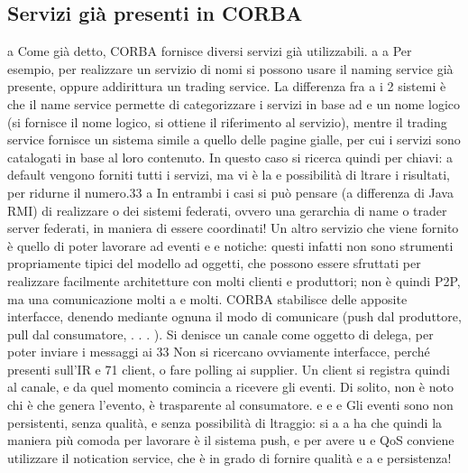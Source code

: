 \documentclass[a4paper,12pt]{article}
\begin{document}
\subsection{Servizi già presenti in CORBA}
a
Come già detto, CORBA fornisce diversi servizi già utilizzabili.
a
a
Per esempio, per realizzare un servizio di nomi si possono usare il naming
service già presente, oppure addirittura un trading service. La differenza fra
a
i 2 sistemi è che il name service permette di categorizzare i servizi in base ad
e
un nome logico (si fornisce il nome logico, si ottiene il riferimento al servizio),
mentre il trading service fornisce un sistema simile a quello delle pagine gialle,
per cui i servizi sono catalogati in base al loro contenuto. In questo caso si
ricerca quindi per chiavi: a default vengono forniti tutti i servizi, ma vi è la
e
possibilità di ltrare i risultati, per ridurne il numero.33
a
In entrambi i casi si può pensare (a differenza di Java RMI) di realizzare
o
dei sistemi federati, ovvero una gerarchia di name o trader server federati, in
maniera di essere coordinati!
Un altro servizio che viene fornito è quello di poter lavorare ad eventi e
e
notiche: questi infatti non sono strumenti propriamente tipici del modello ad
oggetti, che possono essere sfruttati per realizzare facilmente architetture con
molti clienti e produttori; non è quindi P2P, ma una comunicazione molti a
e
molti.
CORBA stabilisce delle apposite interfacce, denendo mediante ognuna il
modo di comunicare (push dal produttore, pull dal consumatore, . . . ). Si
denisce un canale come oggetto di delega, per poter inviare i messaggi ai
33 Non
si ricercano ovviamente interfacce, perché presenti sull'IR
e
71
client, o fare polling ai supplier. Un client si registra quindi al canale, e da
quel momento comincia a ricevere gli eventi.
Di solito, non è noto chi è che genera l'evento, è trasparente al consumatore.
e
e
e
Gli eventi sono non persistenti, senza qualità, e senza possibilità di ltraggio: si
a
a
ha che quindi la maniera più comoda per lavorare è il sistema push, e per avere
u
e
QoS conviene utilizzare il notication service, che è in grado di fornire qualità
e
a
e persistenza!
\end{document}
